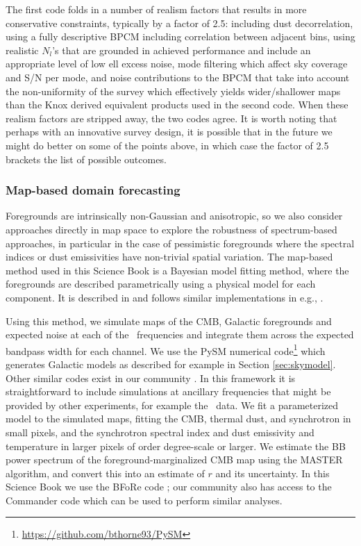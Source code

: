 The first code folds in a number of realism factors that results in more conservative
constraints, typically by a factor of 2.5: including dust decorrelation, using a 
fully descriptive BPCM including correlation between adjacent bins, 
using realistic $N_l$'s that are grounded in achieved performance and include
an appropriate level of low ell excess noise, mode filtering which affect sky coverage
and S/N per mode, and noise contributions to the BPCM that take into account the 
non-uniformity of the survey which effectively yields wider/shallower maps than the 
Knox derived equivalent products used in the second code. When these realism factors
are stripped away, the two codes agree. It is worth noting that perhaps with an 
innovative survey design, it is possible that in the future we might do better on 
some of the points above, in which case the factor of 2.5 brackets the list of 
possible outcomes.  

\subsubsection{Map-based domain forecasting}

Foregrounds are intrinsically non-Gaussian and anisotropic, so we also consider approaches directly in map space to explore the robustness of spectrum-based approaches, in particular in the case of pessimistic foregrounds where the spectral indices or dust emissivities have non-trivial spatial variation. The map-based method used in this Science Book is a Bayesian model fitting method, where the foregrounds are described parametrically using a physical model for each component. It is described in \cite{Alonso:prep} and follows similar implementations in e.g., \cite{Eriksen:2005dr}.

Using this method, we simulate maps of the CMB, Galactic foregrounds and expected noise at each of the \cmbexp\ frequencies and integrate them across the expected bandpass width for each channel. We use the PySM numerical code\footnote{\url{https://github.com/bthorne93/PySM}} which generates Galactic models as described for example in Section \ref{sec:skymodel}. Other similar codes exist in our community \cite{Delabrouille:2012ye}. In this framework it is straightforward to include simulations at ancillary frequencies that might be provided by other experiments, for example the \planck\ data. We fit a parameterized model to the simulated maps, fitting the CMB, thermal dust, and synchrotron in small pixels, and the synchrotron spectral index and dust emissivity and temperature in larger pixels of order degree-scale or larger. We estimate the BB power spectrum of the foreground-marginalized CMB map using the MASTER \cite{Hivon:2001jp} algorithm, and convert this into an estimate of $r$ and its uncertainty. In this Science Book we use the BFoRe code \cite{Alonso:prep}; our community also has access to the Commander code which can be used to perform similar analyses.

